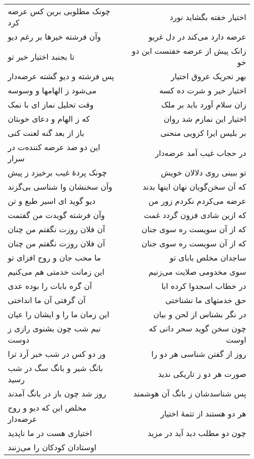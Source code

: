 \begin{center}
\begin{longtable}{l p{0.5cm} r}
چونک مطلوبی برین کس عرضه کرد
&&
اختیار خفته بگشاید نورد
\\
وآن فرشته خیرها بر رغم دیو
&&
عرضه دارد می‌کند در دل غریو
\\
تا بجنبد اختیار خیر تو
&&
زانک پیش از عرضه خفتست این دو خو
\\
پس فرشته و دیو گشته عرضه‌دار
&&
بهر تحریک عروق اختیار
\\
می‌شود ز الهامها و وسوسه
&&
اختیار خیر و شرت ده کسه
\\
وقت تحلیل نماز ای با نمک
&&
زان سلام آورد باید بر ملک
\\
که ز الهام و دعای خوبتان
&&
اختیار این نمازم شد روان
\\
باز از بعد گنه لعنت کنی
&&
بر بلیس ایرا کزویی منحنی
\\
این دو ضد عرضه کننده‌ت در سرار
&&
در حجاب غیب آمد عرضه‌دار
\\
چونک پردهٔ غیب برخیزد ز پیش
&&
تو ببینی روی دلالان خویش
\\
وآن سخنشان وا شناسی بی‌گزند
&&
که آن سخن‌گویان نهان اینها بدند
\\
دیو گوید ای اسیر طبع و تن
&&
عرضه می‌کردم نکردم زور من
\\
وآن فرشته گویدت من گفتمت
&&
که ازین شادی فزون گردد غمت
\\
آن فلان روزت نگفتم من چنان
&&
که از آن سویست ره سوی جنان
\\
آن فلان روزت نگفتم من چنان
&&
که از آن سویست ره سوی جنان
\\
ما محب جان و روح افزای تو
&&
ساجدان مخلص بابای تو
\\
این زمانت خدمتی هم می‌کنیم
&&
سوی مخدومی صلایت می‌زنیم
\\
آن گره بابات را بوده عدی
&&
در خطاب اسجدوا کرده ابا
\\
آن گرفتی آن ما انداختی
&&
حق خدمتهای ما نشناختی
\\
این زمان ما را و ایشان را عیان
&&
در نگر بشناس از لحن و بیان
\\
نیم شب چون بشنوی رازی ز دوست
&&
چون سخن گوید سحر دانی که اوست
\\
ور دو کس در شب خبر آرد ترا
&&
روز از گفتن شناسی هر دو را
\\
بانگ شیر و بانگ سگ در شب رسید
&&
صورت هر دو ز تاریکی ندید
\\
روز شد چون باز در بانگ آمدند
&&
پس شناسدشان ز بانگ آن هوشمند
\\
مخلص این که دیو و روح عرضه‌دار
&&
هر دو هستند از تتمهٔ اختیار
\\
اختیاری هست در ما ناپدید
&&
چون دو مطلب دید آید در مزید
\\
اوستادان کودکان را می‌زنند

\end{longtable}
\end{center}
